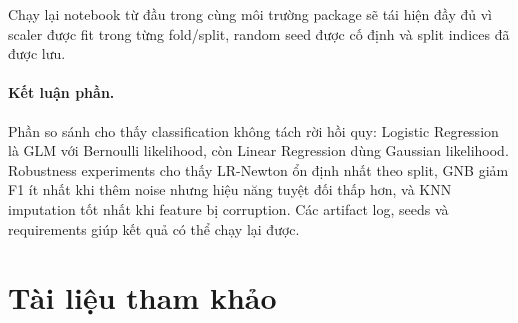 \documentclass[12pt,a4paper]{article}
\begin{document}
\begin{table}[htbp]
\centering
\caption{Runtime/memory mean trong các kịch bản chính.}
\end{table}

Chạy lại notebook từ đầu trong cùng môi trường package sẽ tái hiện đầy đủ vì scaler được fit trong từng fold/split, random seed được cố định và split indices đã được lưu.

\paragraph{Kết luận phần.}
Phần so sánh cho thấy classification không tách rời hồi quy: Logistic Regression là GLM với Bernoulli likelihood, còn Linear Regression dùng Gaussian likelihood. Robustness experiments cho thấy LR-Newton ổn định nhất theo split, GNB giảm F1 ít nhất khi thêm noise nhưng hiệu năng tuyệt đối thấp hơn, và KNN imputation tốt nhất khi feature bị corruption. Các artifact log, seeds và requirements giúp kết quả có thể chạy lại được.

\section*{Tài liệu tham khảo}
\end{document}
